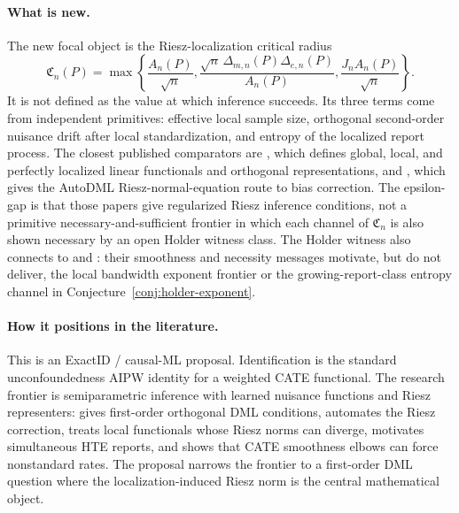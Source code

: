 \documentclass[11pt]{article}
\theoremstyle{definition}
\theoremstyle{plain}
\theoremstyle{remark}
\begin{document}
\paragraph{What is new.}
The new focal object is the Riesz-localization critical radius
\[
\mathfrak C_n(P)=
\max\left\{\frac{A_n(P)}{\sqrt n},
\frac{\sqrt n\,\Delta_{m,n}(P)\Delta_{e,n}(P)}{A_n(P)},
\frac{J_nA_n(P)}{\sqrt n}\right\}.
\]
It is not defined as the value at which inference succeeds.  Its three terms
come from independent primitives: effective local sample size, orthogonal
second-order nuisance drift after local standardization, and entropy of the
localized report process.  The closest published comparators are
\citet[Section~2]{ChernozhukovNeweySingh2022Riesz}, which defines global,
local, and perfectly localized linear functionals and orthogonal
representations, and \citet[Sections~2--3]{ChernozhukovNeweySingh2022AutoDML},
which gives the AutoDML Riesz-normal-equation route to bias correction.  The
epsilon-gap is that those papers give regularized Riesz inference conditions,
not a primitive necessary-and-sufficient frontier in which each channel of
\(\mathfrak C_n\) is also shown necessary by an open Holder witness class.
The Holder witness also connects to
\citet[Theorem~1, Section~3.3, and Theorem~2]{KennedyBalakrishnanRobinsWasserman2024MinimaxCATE}
and \citet[abstract and Sections~2--3]{ArmstrongKolesar2021FiniteSampleATE}:
their smoothness and necessity messages motivate, but do not deliver, the
local bandwidth exponent frontier or the growing-report-class entropy channel in
Conjecture~\ref{conj:holder-exponent}.

\paragraph{How it positions in the literature.}
This is an ExactID / causal-ML proposal.  Identification is the standard
unconfoundedness AIPW identity for a weighted CATE functional.  The research
frontier is semiparametric inference with learned nuisance functions and Riesz
representers: \citet{ChernozhukovEtAl2018DML} gives first-order orthogonal DML
conditions, \citet{ChernozhukovNeweySingh2022AutoDML} automates the Riesz
correction, \citet{ChernozhukovNeweySingh2022Riesz} treats local functionals
whose Riesz norms can diverge, \citet{SemenovaChernozhukov2021DMLCATE}
motivates simultaneous HTE reports, and
\citet{KennedyBalakrishnanRobinsWasserman2024MinimaxCATE} shows that CATE
smoothness elbows can force nonstandard rates.  The proposal narrows the
frontier to a first-order DML question where the localization-induced Riesz
norm is the central mathematical object.
\end{document}
